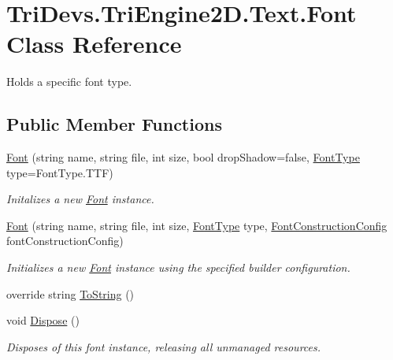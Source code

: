 \hypertarget{class_tri_devs_1_1_tri_engine2_d_1_1_text_1_1_font}{\section{Tri\-Devs.\-Tri\-Engine2\-D.\-Text.\-Font Class Reference}
\label{class_tri_devs_1_1_tri_engine2_d_1_1_text_1_1_font}
}


Holds a specific font type.  


\subsection*{Public Member Functions}
\begin{DoxyCompactItemize}
\item 
\hyperlink{class_tri_devs_1_1_tri_engine2_d_1_1_text_1_1_font_abd7ebef3af655176cec13e88f9fecb61}{Font} (string name, string file, int size, bool drop\-Shadow=false, \hyperlink{namespace_tri_devs_1_1_tri_engine2_d_1_1_text_aa624efa98f1dcfec7cddff37f08bbe75}{Font\-Type} type=Font\-Type.\-T\-T\-F)
\begin{DoxyCompactList}\small\item\em Initalizes a new \hyperlink{class_tri_devs_1_1_tri_engine2_d_1_1_text_1_1_font}{Font} instance. \end{DoxyCompactList}\item 
\hyperlink{class_tri_devs_1_1_tri_engine2_d_1_1_text_1_1_font_a7c1bf1b4bb6fb8f988009bd771a5ee13}{Font} (string name, string file, int size, \hyperlink{namespace_tri_devs_1_1_tri_engine2_d_1_1_text_aa624efa98f1dcfec7cddff37f08bbe75}{Font\-Type} type, \hyperlink{class_tri_devs_1_1_tri_engine2_d_1_1_text_1_1_font_construction_config}{Font\-Construction\-Config} font\-Construction\-Config)
\begin{DoxyCompactList}\small\item\em Initializes a new \hyperlink{class_tri_devs_1_1_tri_engine2_d_1_1_text_1_1_font}{Font} instance using the specified builder configuration. \end{DoxyCompactList}\item 
override string \hyperlink{class_tri_devs_1_1_tri_engine2_d_1_1_text_1_1_font_a68347a3700cc1617cbc7b0d3eb498560}{To\-String} ()
\item 
void \hyperlink{class_tri_devs_1_1_tri_engine2_d_1_1_text_1_1_font_a36c74d7febd08e2a9f474636c527c771}{Dispose} ()
\begin{DoxyCompactList}\small\item\em Disposes of this font instance, releasing all unmanaged resources. \end{DoxyCompactList}\end{DoxyCompactItemize}
